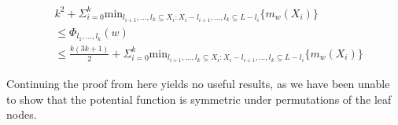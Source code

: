\begin{equation*}
    \begin{split}
        &k^2 + \Sigma_{i=0}^k \mathrm{min}_{l_{i+1}, ..., l_k \subseteq X_i : X_i - l_{i+1}, ..., l_k \subseteq L - l_i} \{ m_w(X_i)\} \\
        &\leq \Phi_{l_1, ..., l_k} (w)  \\
        &\leq \frac{k(3k+1)}{2} + \Sigma_{i=0}^k \mathrm{min}_{l_{i+1}, ..., l_k \subseteq X_i : X_i - l_{i+1}, ..., l_k \subseteq L - l_i} \{ m_w(X_i)\}
    \end{split}
\end{equation*}

Continuing the proof from here yields no useful results, as we have been unable to show that the potential function is symmetric under permutations of the leaf nodes.